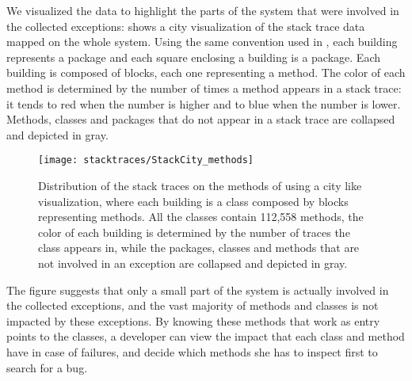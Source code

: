 We visualized the data to highlight the parts of the \pha system that were involved in the collected exceptions:  shows a city visualization of the stack trace data mapped on the whole \pha system.
Using the same convention used in , each building represents a package and each square enclosing a building is a package.
Each building is composed of blocks, each one representing a method.
The color of each method is determined by the number of times a method appears in a stack trace: it tends to red when the number is higher and to blue when the number is lower.
Methods, classes and packages that do not appear in a stack trace are collapsed and depicted in gray.

\begin{figure}[ht]
\begin{center}
  \texttt{[image: stacktraces/StackCity\_methods]}
  \caption{Distribution of the stack traces on the methods of \pha using a city like visualization, where each building is a class composed by blocks representing methods.
All the classes contain 112,558 methods, the color of each building is determined by the number of traces the class appears in, while the packages, classes and methods that are not involved in an exception are collapsed and depicted in gray.}
  \label{fig:stackcity-methods}
\end{center}
\end{figure}

The figure suggests that only a small part of the system is actually involved in the collected exceptions, and the vast majority of methods and classes is not impacted by these exceptions.
By knowing these methods that work as entry points to the classes, a developer can view the impact that each class and method have in case of failures, and decide which methods she has to inspect first to search for a bug.

